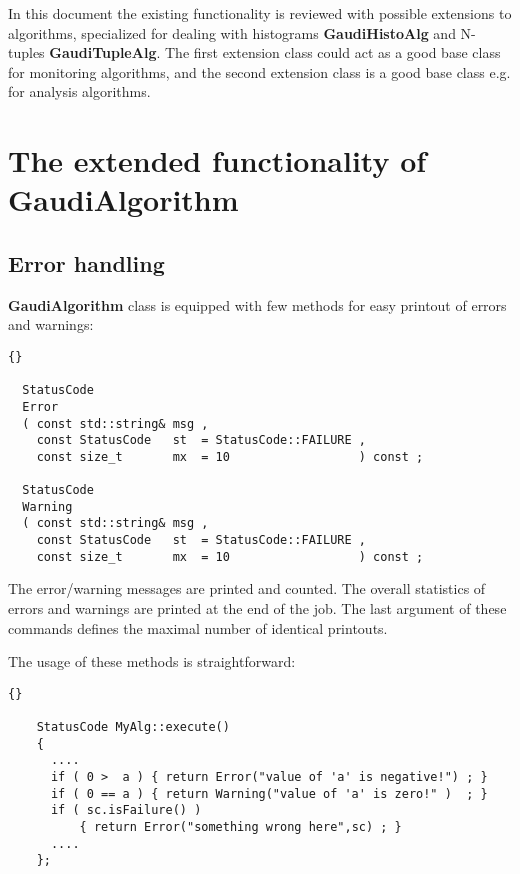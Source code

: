 \documentclass{lhcbnote}
\newcommand{\bftt}         {\ttfamily\bfseries}
\begin{document}
In this document the existing functionality is reviewed
with possible extensions to
algorithms, specialized for dealing with histograms
{\bftt{GaudiHistoAlg}} and N-tuples
{\bftt{GaudiTupleAlg}}. The first extension class
could act as a good base class for monitoring algorithms,
and the second extension class is a good base class
e.g. for analysis algorithms.

\chapter{The extended functionality of {\bftt{GaudiAlgorithm}} }

\section{Error handling}

{\bftt{GaudiAlgorithm}} class is equipped with
few methods for easy printout of errors and warnings:

\begin{scriptsize}
 \begin{lstlisting}{}

  StatusCode
  Error
  ( const std::string& msg ,
    const StatusCode   st  = StatusCode::FAILURE ,
    const size_t       mx  = 10                  ) const ;

  StatusCode
  Warning
  ( const std::string& msg ,
    const StatusCode   st  = StatusCode::FAILURE ,
    const size_t       mx  = 10                  ) const ;

 \end{lstlisting}
\end{scriptsize}

The error/warning messages are printed and counted.
The overall statistics of errors and warnings are
printed at the end of the job. The last argument of
these commands defines the maximal number of identical
printouts.

The usage of these methods is straightforward:

\begin{scriptsize}
 \begin{lstlisting}{}

    StatusCode MyAlg::execute()
    {
      ....
      if ( 0 >  a ) { return Error("value of 'a' is negative!") ; }
      if ( 0 == a ) { return Warning("value of 'a' is zero!" )  ; }
      if ( sc.isFailure() )
          { return Error("something wrong here",sc) ; }
      ....
    };

 \end{lstlisting}
\end{scriptsize}
\end{document}
